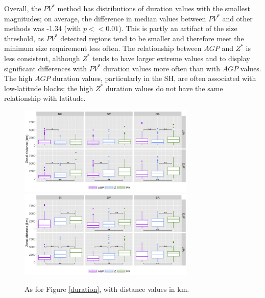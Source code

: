 \documentclass[smallextended]{svjour3}       %
\numberwithin{equation}{section}
\begin{document}
Overall, the $PV^*$ method has distributions of duration values with the smallest magnitudes; on average, the difference in median values between $PV^*$ and other methods was -1.34 (with $p<<0.01$). This is partly an artifact of the size threshold, as $PV^*$ detected regions tend to be smaller and therefore meet the minimum size requirement less often. The relationship between $AGP$ and $Z^*$ is less consistent, although $Z^*$ tends to have larger extreme values and to display significant differences with $PV^*$ duration values more often than with $AGP$ values. The high $AGP$ duration values, particularly in the SH, are often associated with low-latitude blocks; the high $Z^*$ duration values do not have the same relationship with latitude.


\begin{figure}
    \centering
    \includegraphics[width=0.75\textwidth]{fig_distance_NH.png}
    \includegraphics[width=0.75\textwidth]{fig_distance_SH.png}
    \caption{As for Figure \ref{duration}, with distance values in km.}
    \label{dist}
\end{figure}
\end{document}

